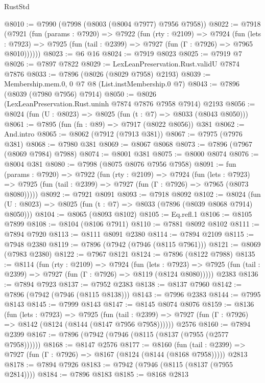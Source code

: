 \begin{lexlean}{RustStd}
\begin{coremodule}
{\begin{coremodule}
{{{{{{{{{{{{{{{{{{{{{{{{{{{{{{{{{{{{{{{{{{{{{{{{{{@8010 := @7990 (@7998 (@8003 (@8004 @7977) @7956 @7958))
@8022 := @7918
    (@7921
      (fun (params : @7920) =>
      @7922
        (fun (rty : @2109) =>
        @7924
          (fun (lets : @7923) =>
          @7925 (fun (tail : @2399) => @7927 (fun (Γ : @7926) => @7965 @8010))))))
@8023 := @6 @16
@8024 := @7919 @8023
@8025 := @7919 @7
@8026 := @7897 @7822
@8029 := LexLeanPreservation.Rust.validU @7874 @7876
@8033 := @7896 (@8026 (@8029 @7958) @2193)
@8039 := Membership.mem.{0, 0} @7 @8 (List.instMembership.{0} @7)
@8043 := @7896 (@8039 (@7980 @7956) @7914)
@8050 := @8026 (LexLeanPreservation.Rust.uninh @7874 @7876 @7958 @7914) @2193
@8056 := @8024 (fun (U : @8023) => @8025 (fun (t : @7) => @8033 (@8043 @8050)))
@8061 := @7895 (fun (fn : @89) => @7917 (@8022 @8056)) @381
@8062 := And.intro
@8065 := @8062 (@7912 (@7913 @381))
@8067 := @7975 (@7976 @381)
@8068 := @7980 @381
@8069 := @8067 @8068
@8073 := @7896 (@7967 (@8069 @7984) @7988)
@8074 := @8001 @381
@8075 := @8000 @8074
@8076 := @8004 @381
@8080 := @7998 (@8075 @8076 @7956 @7958)
@8091 := fun (params : @7920) =>
  @7922
    (fun (rty : @2109) =>
    @7924
      (fun (lets : @7923) =>
      @7925 (fun (tail : @2399) => @7927 (fun (Γ : @7926) => @7965 (@8073 @8080)))))
@8092 := @7921 @8091
@8093 := @7918 @8092
@8102 := @8024 (fun (U : @8023) => @8025 (fun (t : @7) => @8033 (@7896 (@8039 @8068 @7914) @8050)))
@8104 := @8065 (@8093 @8102)
@8105 := Eq.refl.{1}
@8106 := @8105 @7899
@8108 := @8104 (@8106 @7911)
@8110 := @7881 @8092 @8102
@8111 := @7894 @7920
@8113 := @8111 @8091 @2380
@8114 := @7894 @2109
@8115 := @7948 @2380
@8119 := @7896 (@7942 (@7946 (@8115 @7961)))
@8121 := @8069 (@7983 @2380)
@8122 := @7967 @8121
@8124 := @7896 (@8122 @7988)
@8135 := @8114
    (fun (rty : @2109) =>
    @7924
      (fun (lets : @7923) =>
      @7925 (fun (tail : @2399) => @7927 (fun (Γ : @7926) => @8119 (@8124 @8080)))))
    @2383
@8136 := @7894 @7923
@8137 := @7952 @2383
@8138 := @8137 @7960
@8142 := @7896 (@7942 (@7946 (@8115 @8138)))
@8143 := @7996 @2383
@8144 := @7995 @8143
@8145 := @7999 @8143
@8147 := @8145 @8074 @8076
@8159 := @8136
    (fun (lets : @7923) =>
    @7925
      (fun (tail : @2399) => @7927 (fun (Γ : @7926) => @8142 (@8124 (@8144 (@8147 @7956 @7958))))))
    @2576
@8160 := @7894 @2399
@8167 := @7896 (@7942 (@7946 (@8115 (@8137 (@7955 (@2577 @7958))))))
@8168 := @8147 @2576
@8177 := @8160
    (fun (tail : @2399) => @7927 (fun (Γ : @7926) => @8167 (@8124 (@8144 (@8168 @7958)))))
    @2813
@8178 := @7894 @7926
@8183 := @7942 (@7946 (@8115 (@8137 (@7955 @2814))))
@8184 := @7896 @8183
@8185 := @8168 @2813
}}}}}}}}}}}}}}}}}}}}}}}}}}}}}}}}}}}}}}}}}}}}}}}}}}
\end{coremodule}}
\end{coremodule}
\end{lexlean}
